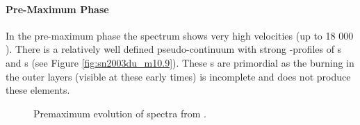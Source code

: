 \paragraph{Pre-Maximum Phase}
In the pre-maximum phase the spectrum shows very high velocities (up to 18 000 \kms). There is a relatively well defined pseudo-continuum with strong \pcygni-profiles of \ime s and \ige s (see Figure \ref{fig:sn2003du_m10.9}). These \ige s are primordial as the burning in the outer layers (visible at these early times) is incomplete and does not produce these elements. 


\begin{figure}[htbp] %
   \centering
   \caption{Premaximum evolution of  spectra from \cite{2011MNRAS.410.1725T}.}
   \label{fig:sn2003du_premax}
\end{figure}

